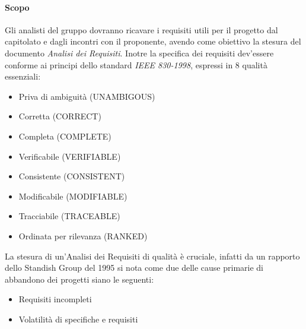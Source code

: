 			\paragraph*{Scopo}
				Gli analisti del gruppo dovranno ricavare i requisiti utili per il progetto
				dal capitolato e dagli incontri con il proponente, avendo come obiettivo la
				stesura del documento \textit{Analisi dei Requisiti}.
			        Inotre la specifica dei requisiti dev'essere conforme ai principi dello standard \textit{IEEE 830-1998}, espressi in 8 qualit\`a
			        essenziali:
				\begin{itemize}
				\item Priva di ambiguit\`a (UNAMBIGOUS)
				\item Corretta (CORRECT)
				\item Completa (COMPLETE)
				\item Verificabile (VERIFIABLE)
				\item Consistente (CONSISTENT)
				\item Modificabile (MODIFIABLE)
				\item Tracciabile (TRACEABLE)
				\item Ordinata per rilevanza (RANKED)
				\end{itemize}
			        La stesura di un'Analisi dei Requisiti di qualit\`a \`e cruciale, infatti
			        da un rapporto dello Standish Group del 1995 si nota come due delle cause primarie
			        di abbandono dei progetti siano le seguenti:
				\begin{itemize}
				\item Requisiti incompleti
				\item Volatilità di specifiche e requisiti
				\end{itemize}
			
			
